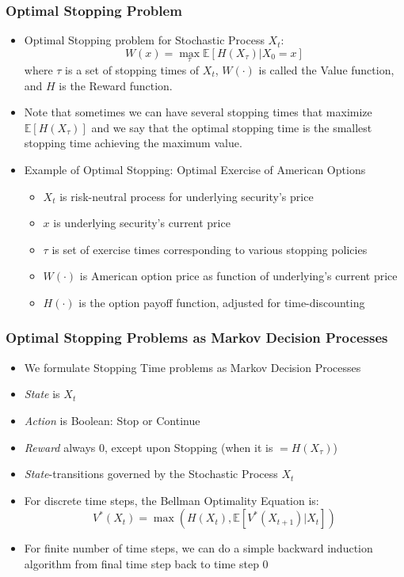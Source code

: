 \documentclass[handout]{beamer}
\begin{document}
\begin{frame}
\frametitle{Optimal Stopping Problem}
\pause
\begin{itemize}[<+->]
\item Optimal Stopping problem for Stochastic Process $X_t$: 
$$W(x) = \max_{\tau} \mathbb{E}[H(X_{\tau})|X_0 = x]$$
 where $\tau$ is a set of stopping times of $X_t$, $W(\cdot)$ is called the Value function, and $H$ is the Reward function.
\item Note that sometimes we can have several stopping times that maximize $\mathbb{E}[H(X_{\tau})]$ and we say that the optimal stopping time
is the smallest stopping time achieving the maximum value.
\item Example of Optimal Stopping: Optimal Exercise of American Options
\begin{itemize}
\item $X_t$ is risk-neutral process for underlying security's price
\item $x$ is underlying security's current price
\item $\tau$ is set of exercise times corresponding to various stopping policies
\item $W(\cdot)$ is American option price as function of underlying's current price
\item $H(\cdot)$ is the option payoff function, adjusted for time-discounting
\end{itemize}
\end{itemize}
\end{frame}


\begin{frame}
\frametitle{Optimal Stopping Problems as Markov Decision Processes}
\pause
\begin{itemize}[<+->]
\item We formulate Stopping Time problems as Markov Decision Processes
\item {\em State} is $X_t$
\item {\em Action} is Boolean: Stop or Continue
\item {\em Reward} always 0, except upon Stopping (when it is $=H(X_{\tau})$)
\item {\em State}-transitions governed by the Stochastic Process $X_t$
\item For discrete time steps, the Bellman Optimality Equation is:
$$V^*(X_t) = \max(H(X_t), \mathbb{E}[V^*(X_{t+1})|X_t])$$
\item For finite number of time steps, we can do a simple backward induction algorithm from final time step back to time step 0
\end{itemize}
\end{frame}
\end{document}
